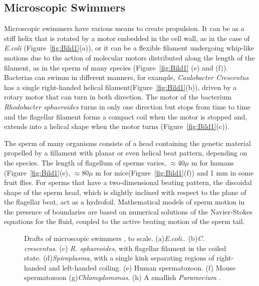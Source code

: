 \subsection{Microscopic Swimmers}
\label{sec:section 1}

Microscopic swimmers have various means to create propulsion. It can be as a stiff helix that is rotated by a motor embedded in the cell wall, as in the case of \textit{E.coli}
\cite{berg_bacteria_1973}(Figure~\ref{fig:Bild1}(a)), or it can be a flexible filament undergoing whip-like motions due to the action of molecular motors distributed along the
length of the filament, as in the sperm of many species\cite{blum_biophysics_1973} (Figure~\ref{fig:Bild1} (e) and (f)). Bacterias can swimm in different manners, for example, 
\textit{Caulobacter Crescentus}  has a single right-handed helical filament(Figure~\ref{fig:Bild1}(b)), driven by a rotary motor that can turn in both direction. The motor of the
bacterium \textit{Rhodobacter sphaeroides} turns in only one direction but stops from time to time and the flagellar filament forms a compact coil when the motor is stopped and, 
extends into a helical shape when the motor turns (Figure~\ref{fig:Bild1}(c)).\par

The sperm of many organisms consists of a head containing the genetic material propelled by a fillament with planar or even helical beat pattern, depending on the species. The 
length of flagellum of sperms varies, $\approx40\mu$ m for humans\cite{suarez_sperm_2006} (Figure~\ref{fig:Bild1}(e), $\approx80\mu$ m for mice(Figure~\ref{fig:Bild1}(f)) and
1 mm in some fruit flies\cite{joly_disentangling_1995}. For sperms that have a two-dimensional beating pattern\cite{elgeti_hydrodynamics_2010}, the discoidal shape of the sperm
head, which is slightly inclined with respect to the plane of the flagellar beat, act as a hydrofoil. 
Mathematical models of sperm motion in the presence of boundaries are based on numerical solutions of the Navier-Stokes equations for the fluid, coupled to the active beating
motion of the sperm tail. 



\begin{figure}[H]
\centering
  \begin{footnotesize}
  
  \caption[inprogress]{Drafts of microscopic swimmers , to scale. (a)\textit{E.coli.}. (b)\textit{C. crescentus}. (c) \textit{R. sphareoides}, with flagellar filament in the coiled
   state. (d)\textit{Spiroplasma}, with a single kink separating regions of right-handed and left-handed coiling. (e) Human spermatozoon. (f) Mouse spermatozoon (g)\textit{Chlamydomonas}.
   (h) A smallish \textit{Paramecium} \cite{lauga_hydrodynamics_2009}.}
  \label{fig:Bild2.1}
  \end{footnotesize}
\end{figure} 

